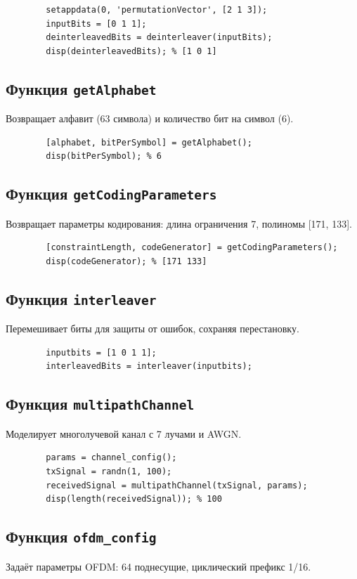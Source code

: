 \documentclass[a4paper,14pt,oneside,openany]{memoir}
\begin{document}
	\begin{lstlisting}
		setappdata(0, 'permutationVector', [2 1 3]);
		inputBits = [0 1 1];
		deinterleavedBits = deinterleaver(inputBits);
		disp(deinterleavedBits); % [1 0 1]
	\end{lstlisting}
	
	\subsection{Функция \texttt{getAlphabet}}
	Возвращает алфавит (63 символа) и количество бит на символ (6).
	
	\begin{lstlisting}
		[alphabet, bitPerSymbol] = getAlphabet();
		disp(bitPerSymbol); % 6
	\end{lstlisting}
	
	\subsection{Функция \texttt{getCodingParameters}}
	Возвращает параметры кодирования: длина ограничения 7, полиномы [171, 133].
	
	\begin{lstlisting}
		[constraintLength, codeGenerator] = getCodingParameters();
		disp(codeGenerator); % [171 133]
	\end{lstlisting}
	
	\subsection{Функция \texttt{interleaver}}
	Перемешивает биты для защиты от ошибок, сохраняя перестановку.
	
	\begin{lstlisting}
		inputbits = [1 0 1 1];
		interleavedBits = interleaver(inputbits);
	\end{lstlisting}
	
	\subsection{Функция \texttt{multipathChannel}}
	Моделирует многолучевой канал с 7 лучами и AWGN.
	
	\begin{lstlisting}
		params = channel_config();
		txSignal = randn(1, 100);
		receivedSignal = multipathChannel(txSignal, params);
		disp(length(receivedSignal)); % 100
	\end{lstlisting}
	
	\subsection{Функция \texttt{ofdm\_config}}
	Задаёт параметры OFDM: 64 поднесущие, циклический префикс 1/16.
	
\end{document}
